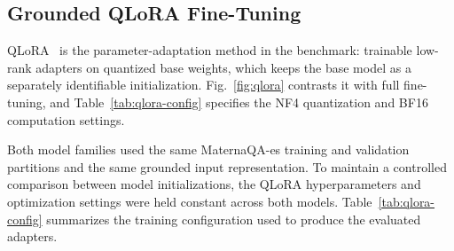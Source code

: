 \subsection{Grounded QLoRA Fine-Tuning}
QLoRA~\cite{dettmers2023qlora} is the parameter-adaptation method in the
benchmark: trainable low-rank adapters on quantized base weights, which
keeps the base model as a separately identifiable initialization.
Fig.~\ref{fig:qlora} contrasts it with full fine-tuning, and
Table~\ref{tab:qlora-config} specifies the NF4 quantization and BF16
computation settings.

Both model families used the same MaternaQA-es training and validation
partitions and the same grounded input representation. To maintain a
controlled comparison between model initializations, the QLoRA
hyperparameters and optimization settings were held constant across both
models. Table~\ref{tab:qlora-config} summarizes the training configuration
used to produce the evaluated adapters.

